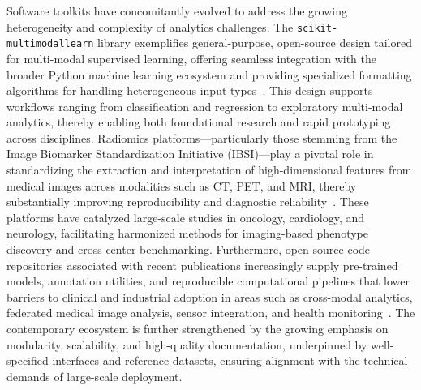 \documentclass[sigconf]{acmart}
\begin{document}
Software toolkits have concomitantly evolved to address the growing heterogeneity and complexity of analytics challenges. The \texttt{scikit-multimodallearn} library exemplifies general-purpose, open-source design tailored for multi-modal supervised learning, offering seamless integration with the broader Python machine learning ecosystem and providing specialized formatting algorithms for handling heterogeneous input types~\cite{ref103,ref40}. This design supports workflows ranging from classification and regression to exploratory multi-modal analytics, thereby enabling both foundational research and rapid prototyping across disciplines. Radiomics platforms---particularly those stemming from the Image Biomarker Standardization Initiative (IBSI)---play a pivotal role in standardizing the extraction and interpretation of high-dimensional features from medical images across modalities such as CT, PET, and MRI, thereby substantially improving reproducibility and diagnostic reliability~\cite{ref104,ref44,ref45,ref46,ref40,ref105}. These platforms have catalyzed large-scale studies in oncology, cardiology, and neurology, facilitating harmonized methods for imaging-based phenotype discovery and cross-center benchmarking. Furthermore, open-source code repositories associated with recent publications increasingly supply pre-trained models, annotation utilities, and reproducible computational pipelines that lower barriers to clinical and industrial adoption in areas such as cross-modal analytics, federated medical image analysis, sensor integration, and health monitoring~\cite{ref51,ref106,ref107,ref48,ref58}. The contemporary ecosystem is further strengthened by the growing emphasis on modularity, scalability, and high-quality documentation, underpinned by well-specified interfaces and reference datasets, ensuring alignment with the technical demands of large-scale deployment.
\end{document}

